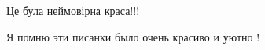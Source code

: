  
 
 
 
 

\qqSecCmt


Це була неймовірна краса!!!


Я помню эти писанки было очень красиво и уютно !
